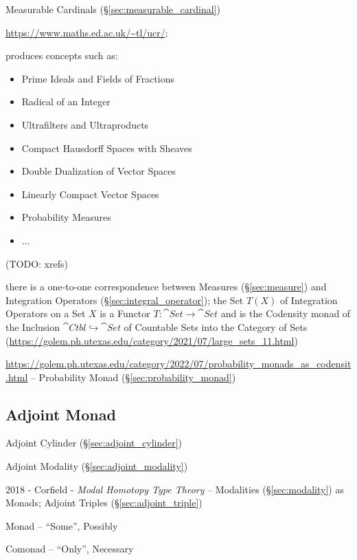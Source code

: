 \fist Measurable Cardinals (\S\ref{sec:measurable_cardinal})

\url{https://www.maths.ed.ac.uk/~tl/ucr/}:

produces concepts such as:
\begin{itemize}
  \item Prime Ideals and Fields of Fractions
  \item Radical of an Integer
  \item Ultrafilters and Ultraproducts
  \item Compact Hausdorff Spaces with Sheaves
  \item Double Dualization of Vector Spaces
  \item Linearly Compact Vector Spaces
  \item Probability Measures
  \item ...
\end{itemize}
(TODO: xrefs)

there is a one-to-one correspondence between Measures (\S\ref{sec:measure}) and
Integration Operators (\S\ref{sec:integral_operator}); the Set $T(X)$ of
Integration Operators on a Set $X$ is a Functor $T : \cat{Set} \to \cat{Set}$
and is the Codensity monad of the Inclusion
$\cat{Ctbl} \hookrightarrow \cat{Set}$ of Countable Sets into the Category of
Sets
(\url{https://golem.ph.utexas.edu/category/2021/07/large_sets_11.html})

\url{https://golem.ph.utexas.edu/category/2022/07/probability_monads_as_codensit.html}
-- Probability Monad (\S\ref{sec:probability_monad})



\subsection{Adjoint Monad}\label{sec:adjoint_monad}

Adjoint Cylinder (\S\ref{sec:adjoint_cylinder})

Adjoint Modality (\S\ref{sec:adjoint_modality})

2018 - Corfield - \emph{Modal Homotopy Type Theory} -- Modalities
(\S\ref{sec:modality}) as Monads; Adjoint Triples (\S\ref{sec:adjoint_triple})

Monad -- ``Some'', Possibly

Comonad -- ``Only'', Necessary



